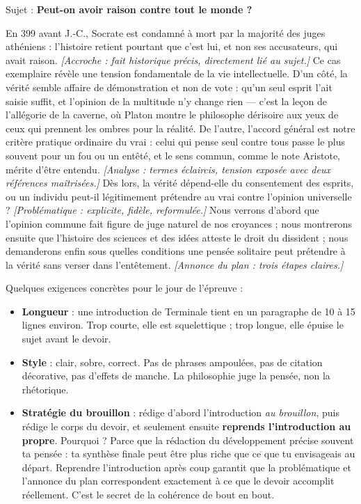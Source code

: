 \documentclass[11pt]{article}
\newcounter{popsec}
\newcounter{popsub}
\newcommand{\courssub}[1]{%
  \stepcounter{popsub}%
  \par\vspace{9pt}\noindent{\popxbold\fontsize{11.5}{13}\selectfont\color{popink}{\color{poporange}\thepopsec.\thepopsub}\hspace{6pt}#1}\par\nopagebreak\vspace{4pt}
}
\begin{document}
\begin{exemplebox}
Sujet : \textbf{Peut-on avoir raison contre tout le monde ?}

\guillemotleft En 399 avant J.-C., Socrate est condamné à mort par la majorité des juges athéniens : l'histoire retient pourtant que c'est lui, et non ses accusateurs, qui avait raison. \emph{[Accroche : fait historique précis, directement lié au sujet.]} Ce cas exemplaire révèle une tension fondamentale de la vie intellectuelle. D'un côté, la vérité semble affaire de démonstration et non de vote : qu'un seul esprit l'ait saisie suffit, et l'opinion de la multitude n'y change rien — c'est la leçon de l'allégorie de la caverne, où Platon montre le philosophe dérisoire aux yeux de ceux qui prennent les ombres pour la réalité. De l'autre, l'accord général est notre critère pratique ordinaire du vrai : celui qui pense seul contre tous passe le plus souvent pour un fou ou un entêté, et le sens commun, comme le note Aristote, mérite d'être entendu. \emph{[Analyse : termes éclaircis, tension exposée avec deux références maîtrisées.]} Dès lors, la vérité dépend-elle du consentement des esprits, ou un individu peut-il légitimement prétendre au vrai contre l'opinion universelle ? \emph{[Problématique : explicite, fidèle, reformulée.]} Nous verrons d'abord que l'opinion commune fait figure de juge naturel de nos croyances ; nous montrerons ensuite que l'histoire des sciences et des idées atteste le droit du dissident ; nous demanderons enfin sous quelles conditions une pensée solitaire peut prétendre à la vérité sans verser dans l'entêtement. \emph{[Annonce du plan : trois étapes claires.]} \guillemotright
\end{exemplebox}

\courssub{Longueur, style et stratégie de rédaction au Bac}

Quelques exigences concrètes pour le jour de l'épreuve :

\begin{itemize}
\item \textbf{Longueur} : une introduction de Terminale tient en un paragraphe de 10 à 15 lignes environ. Trop courte, elle est squelettique ; trop longue, elle épuise le sujet avant le devoir.
\item \textbf{Style} : clair, sobre, correct. Pas de phrases ampoulées, pas de citation décorative, pas d'effets de manche. La philosophie juge la pensée, non la rhétorique.
\item \textbf{Stratégie du brouillon} : rédige d'abord l'introduction \emph{au brouillon}, puis rédige le corps du devoir, et seulement ensuite \textbf{reprends l'introduction au propre}. Pourquoi ? Parce que la rédaction du développement précise souvent ta pensée : ta synthèse finale peut être plus riche que ce que tu envisageais au départ. Reprendre l'introduction après coup garantit que la problématique et l'annonce du plan correspondent exactement à ce que le devoir accomplit réellement. C'est le secret de la cohérence de bout en bout.
\end{itemize}
\end{document}

